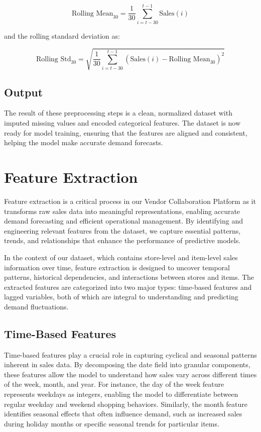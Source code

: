 \[
\text{Rolling Mean}_{30} = \frac{1}{30} \sum_{i=t-30}^{t-1} \text{Sales}(i)
\]

and the rolling standard deviation as:

\[
\text{Rolling Std}_{30} = \sqrt{\frac{1}{30} \sum_{i=t-30}^{t-1} (\text{Sales}(i) - \text{Rolling Mean}_{30})^2}
\]


\subsection*{Output}

The result of these preprocessing steps is a clean, normalized dataset with imputed missing values and encoded categorical features. The dataset is now ready for model training, ensuring that the features are aligned and consistent, helping the model make accurate demand forecasts.

\section{Feature Extraction}

Feature extraction is a critical process in our Vendor Collaboration Platform as it transforms raw sales data into meaningful representations, enabling accurate demand forecasting and efficient operational management. By identifying and engineering relevant features from the dataset, we capture essential patterns, trends, and relationships that enhance the performance of predictive models.

In the context of our dataset, which contains store-level and item-level sales information over time, feature extraction is designed to uncover temporal patterns, historical dependencies, and interactions between stores and items. The extracted features are categorized into two major types: time-based features and lagged variables, both of which are integral to understanding and predicting demand fluctuations.

\subsection{Time-Based Features}

Time-based features play a crucial role in capturing cyclical and seasonal patterns inherent in sales data. By decomposing the date field into granular components, these features allow the model to understand how sales vary across different times of the week, month, and year. For instance, the day of the week feature represents weekdays as integers, enabling the model to differentiate between regular weekday and weekend shopping behaviors. Similarly, the month feature identifies seasonal effects that often influence demand, such as increased sales during holiday months or specific seasonal trends for particular items.

